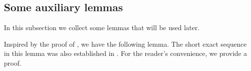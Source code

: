 \documentclass[11pt,reqno]{amsart}
\numberwithin{equation}{section}
\newtheorem{lemma}[theorem]{Lemma}
\newcommand{\cB}{\mathcal B}
\newcommand{\Id}{\operatorname{Id}}
\begin{document}
\subsection{Some auxiliary lemmas}

In this subsection we collect some lemmas that will be used later.

%

Inspired by the proof of \cite[Theorem~3.13]{Hu}, we have the following lemma. The short exact sequence in this lemma was also  established in \cite[Lemma~4.5]{LG}. For the reader's convenience, we provide a proof.
\end{document}
